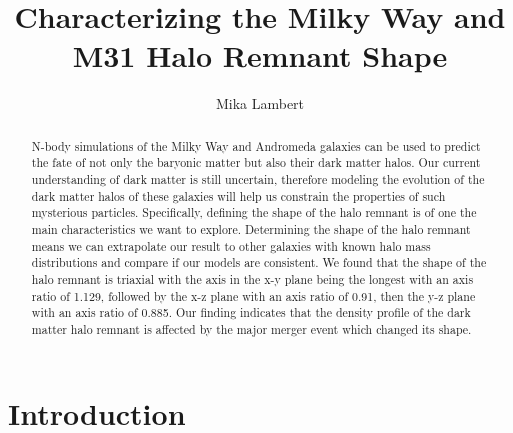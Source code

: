 \documentclass[linenumbers, twocolumn]{aastex631}
\begin{document}
\title{Characterizing the Milky Way and M31 Halo Remnant Shape}



\author[0000-0002-2527-8899]{Mika Lambert}

\received{\today}

\begin{abstract}

N-body simulations of the Milky Way and Andromeda galaxies can be used to predict the fate of not only the baryonic matter but also their dark matter halos. 
Our current understanding of dark matter is still uncertain, therefore modeling the evolution of the dark matter halos of these galaxies will help us constrain the properties of such mysterious particles. 
Specifically, defining the shape of the halo remnant is of one the main characteristics we want to explore. 
Determining the shape of the halo remnant means we can extrapolate our result to other galaxies with known halo mass distributions and compare if our models are consistent.
We found that the shape of the halo remnant is triaxial with the axis in the x-y plane being the longest with an axis ratio of 1.129, followed by the x-z plane with an axis ratio of 0.91, then the y-z plane with an axis ratio of 0.885. 
Our finding indicates that the density profile of the dark matter halo remnant is affected by the major merger event which changed its shape.

\end{abstract}



\section{Introduction} \label{sec:intro}
\end{document}
